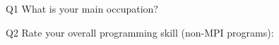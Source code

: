 \begin{description}%
\item{Q1} What is your main occupation?%
\item{Q2} Rate your overall programming skill (non-MPI programs):%
\end{description}%
